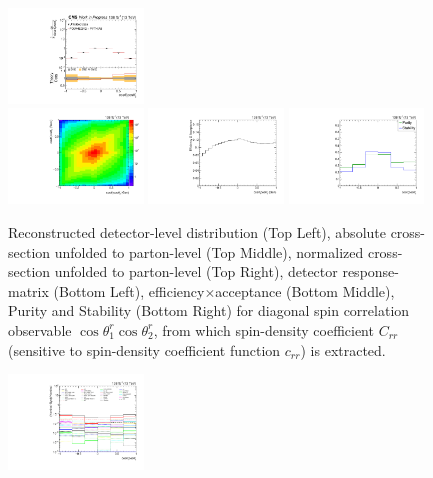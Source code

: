 \begin{refsection}
\begin{figure}[htb]
\begin{center}
 \includegraphics[width=0.32\textwidth]{fig_fullRun2UL/unfolding/combined/UnfoldedResultsNorm_c_rr.pdf} \\
 \includegraphics[width=0.32\textwidth]{fig_fullRun2UL/unfolding/combined/ResponseMatrix_c_rr.pdf}
 \includegraphics[width=0.32\textwidth]{fig_fullRun2UL/unfolding/combined/TotEff_c_rr.pdf}
 \includegraphics[width=0.32\textwidth]{fig_fullRun2UL/unfolding/combined/PurStab_c_rr.pdf} \\
\caption{Reconstructed detector-level distribution (Top Left), absolute cross-section unfolded to parton-level (Top Middle), normalized cross-section unfolded to parton-level (Top Right), detector response-matrix (Bottom Left), efficiency$\times$acceptance (Bottom Middle), Purity and Stability (Bottom Right) for diagonal spin correlation observable $\cos\theta_{1}^{r}\cos\theta_{2}^{r}$, from which spin-density coefficient $C_{rr}$ (sensitive to spin-density coefficient function $c_{r r}$) is extracted.}
\label{fig:c_rr}
\end{center}
\end{figure}
\clearpage
\begin{figure}[htb]
\begin{center}
 \includegraphics[width=0.32\textwidth]{fig_fullRun2UL/unfolding/combined/deltaSystCombinedlog_rebinnedB_c_rr.pdf}

\end{center}
\end{figure}
\end{refsection}
